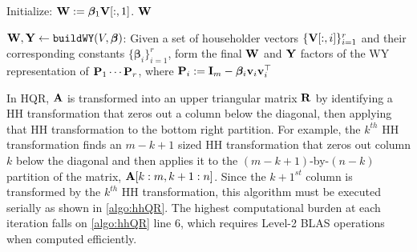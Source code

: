 \begin{algorithm2e}
	\DontPrintSemicolon %
	Initialize: $\mathbf{W}:=\bm{\beta}_1\mathbf{V}[:,1]$.
	\Return $\mathbf{W}$
	\caption{$\mathbf{W},\mathbf{Y}\gets {\tt buildWY}(V, \bm{\beta})$: Given a set of householder vectors $\{\mathbf{V}[:,i]\}_{i=1}^r$ and their corresponding constants $\{\bm{\beta}_i\}_{i=1}^r$, form the final $\mathbf{W}$ and $\mathbf{Y}$ factors of the WY representation of $\mathbf{P}_1\cdots \mathbf{P}_r$, where $\mathbf{P}_i := \mathbf{I}_m - \bm{\beta}_i\mathbf{v}_i\mathbf{v}_i^{\top}$}
	\label{algo:buildWY}
\end{algorithm2e}

In HQR, $\mathbf{A}$ is transformed into an upper triangular matrix $\mathbf{R}$ by identifying a HH transformation that zeros out a column below the diagonal, then applying that HH transformation to the bottom right partition. 
For example, the $k^{th}$ HH transformation finds an $m-k+1$ sized HH transformation that zeros out column $k$ below the diagonal and then applies it to the $(m-k+1)$-by-$(n-k)$ partition of the matrix, $\mathbf{A}[k:m,k+1:n]$.
Since the $k+1^{st}$ column is transformed by the $k^{th}$ HH transformation, this algorithm must be executed serially as shown in \cref{algo:hhQR}.
The highest computational burden at each iteration falls on \cref{algo:hhQR} line 6, which requires Level-2 BLAS operations when computed efficiently. \par

